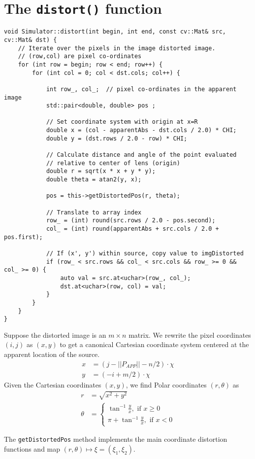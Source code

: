 \documentclass{scrartcl}
\begin{document}
\section{The \texttt{distort()} function}

\begin{lstlisting}
void Simulator::distort(int begin, int end, const cv::Mat& src, cv::Mat& dst) {
    // Iterate over the pixels in the image distorted image.
    // (row,col) are pixel co-ordinates
    for (int row = begin; row < end; row++) {
        for (int col = 0; col < dst.cols; col++) {

            int row_, col_;  // pixel co-ordinates in the apparent image
            std::pair<double, double> pos ;

            // Set coordinate system with origin at x=R
            double x = (col - apparentAbs - dst.cols / 2.0) * CHI;
            double y = (dst.rows / 2.0 - row) * CHI;

            // Calculate distance and angle of the point evaluated 
            // relative to center of lens (origin)
            double r = sqrt(x * x + y * y);
            double theta = atan2(y, x);

            pos = this->getDistortedPos(r, theta);

            // Translate to array index
            row_ = (int) round(src.rows / 2.0 - pos.second);
            col_ = (int) round(apparentAbs + src.cols / 2.0 + pos.first);

            // If (x', y') within source, copy value to imgDistorted
            if (row_ < src.rows && col_ < src.cols && row_ >= 0 && col_ >= 0) {
                auto val = src.at<uchar>(row_, col_);
                dst.at<uchar>(row, col) = val;
            }
        }
    }
}
\end{lstlisting}

Suppose the distorted image is an $m\times n$ matrix.
We rewrite the pixel coordinates $(i,j)$ as $(x,y)$ to get
a canonical Cartesian coordinate system centered at
the apparent location of the source.
\begin{align}
     x &= (j - ||P_{APP}|| - n/2)\cdot\chi \\
     y &= (-i + m/2)\cdot\chi 
\end{align}
Given the Cartesian coordinates $(x,y)$, we find Polar coordinates
$(r,\theta)$ as
\begin{align}
   r &= \sqrt{x^2+y^2}\\
   \theta &= 
     \begin{cases}
        \tan^{-1} \frac{y}{x}, \text{ if } x\ge0\\
        \pi + \tan^{-1} \frac{y}{x}, \text{ if } x<0
     \end{cases}
\end{align}

The \texttt{getDistortedPos} method implements the main coordinate distortion
functions and map $(r, \theta) \mapsto \xi = (\xi_1,\xi_2)$.
\end{document}
